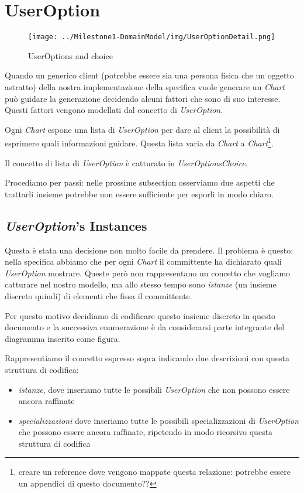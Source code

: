 \section{UserOption}
\label{sec:userOption}

\begin{figure}[h!] 
	\centering
	\texttt{[image: ../Milestone1-DomainModel/img/UserOptionDetail.png]}
	\caption{UserOptions and choice}
	\label{fig:userOption} 
\end{figure}

Quando un generico client (potrebbe essere sia una persona fisica che un
oggetto astratto) della nostra implementazione della specifica vuole generare
un \emph{Chart} pu\`o guidare la generazione decidendo alcuni fattori che sono
di suo interesse. Questi fattori vengono modellati dal concetto di
\emph{UserOption}.

Ogni \emph{Chart} espone una lista di \emph{UserOption} per dare al client la
possibilit\`a di esprimere quali informazioni guidare. Questa lista varia da
\emph{Chart} a \emph{Chart}\footnote{creare un reference dove vengono mappate
questa relazione: potrebbe essere un appendici di questo documento??}.

Il concetto di lista di \emph{UserOption} \`e catturato in
\emph{UserOptionsChoice}.

Procediamo per passi: nelle prossime subsection osserviamo due aspetti che
trattarli insieme potrebbe non essere sufficiente per esporli in modo chiaro.

\subsection{\emph{UserOption}'s Instances}
Questa \`e stata una decisione non molto facile da prendere. Il problema \`e
questo: nella specifica abbiamo che per ogni \emph{Chart} il committente ha
dichiarato quali \emph{UserOption} mostrare. Queste per\`o non rappresentano un
concetto che vogliamo catturare nel nostro modello, ma allo stesso tempo sono
\emph{istanze} (un insieme discreto quindi) di elementi che fissa il
committente.

Per questo motivo decidiamo di codificare questo insieme discreto in questo
documento e la successiva enumerazione \`e da considerarsi parte integrante del
diagramma inserito come figura.

Rappresentiamo il concetto espresso sopra indicando due descrizioni con questa
struttura di codifica:
\begin{itemize}
  \item \emph{istanze}, dove inseriamo tutte le possibili \emph{UserOption} che
  non possono essere ancora raffinate
  \item \emph{specializzazioni} dove inseriamo tutte le possibili
  specializzazioni di \emph{UserOption} che possono essere ancora raffinate,
  ripetendo in modo ricorsivo questa struttura di codifica
\end{itemize}

